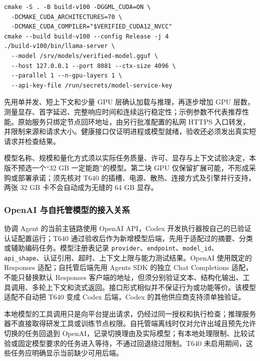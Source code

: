 \documentclass[11pt,a4paper]{article}
\begin{document}
\par\noindent\begin{minipage}{\linewidth}
\begin{lstlisting}
cmake -S . -B build-v100 -DGGML_CUDA=ON \
  -DCMAKE_CUDA_ARCHITECTURES=70 \
  -DCMAKE_CUDA_COMPILER="$VERIFIED_CUDA12_NVCC"
cmake --build build-v100 --config Release -j 4
./build-v100/bin/llama-server \
  --model /srv/models/verified-model.gguf \
  --host 127.0.0.1 --port 8081 --ctx-size 4096 \
  --parallel 1 --n-gpu-layers 1 \
  --api-key-file /run/secrets/model-service-key
\end{lstlisting}
\end{minipage}\par


先用单并发、短上下文和少量 GPU 层确认加载与推理，再逐步增加 GPU 层数，测量显存、首字延迟、完整响应时间和连续运行稳定性；示例参数不代表推荐性能。原始服务只绑定节点回环地址，由另行批准配置的私网 HTTPS 入口转发，并限制来源和请求大小。健康接口仅证明进程或模型就绪，验收还必须发出真实短请求并检查结果。\cite{ops-llama-server}

模型名称、规模和量化方式须以实际任务质量、许可、显存与上下文试验决定，本版不预选一个“32 GB 一定能跑”的模型。第二块 GPU 仅保留扩展可能，不形成采购或部署承诺；须先核对 T640 的插槽、电源、散热、连接方式及引擎并行支持，两张 32 GB 卡不会自动成为无缝的 64 GB 显存。

\subsubsection{OpenAI 与自托管模型的接入关系}

协调 Agent 的当前主链路使用 OpenAI API，Codex 开发执行器按自己的已验证认证配置运行；T640 通过验收后作为新增模型后端，先用于适配过的摘要、分类或辅助编码任务。模型注册表记录 \texttt{provider}、\texttt{endpoint}、\texttt{model\_id}、\texttt{api\_shape}、认证引用、超时、上下文上限与能力测试结果。OpenAI 使用既定的 Responses 适配；自托管后端先用 Agents SDK 的独立 Chat Completions 适配，不能只替换默认 Responses 客户端的地址，但须分别验证文本、结构化输出、工具调用、多轮上下文和流式返回。接口形式相似并不保证行为或功能等价。该模型适配不自动把 T640 变成 Codex 后端，Codex 的其他供应商支持须单独验证。\cite{agents-models,ops-llama-server}

本地模型的工具调用只是向平台提出请求，仍经过同一授权和执行检查；推理服务器不直接取得研发工具或训练节点权限。自托管端离线时仅对允许出域且预先允许切换的任务回退到 OpenAI，记录切换理由及实际模型；有本地处理限制、比较试验或固定模型要求的任务进入等待，不通过回退绕过限制。T640 未启用期间，这些任务应明确显示当前缺少可用后端。
\end{document}
